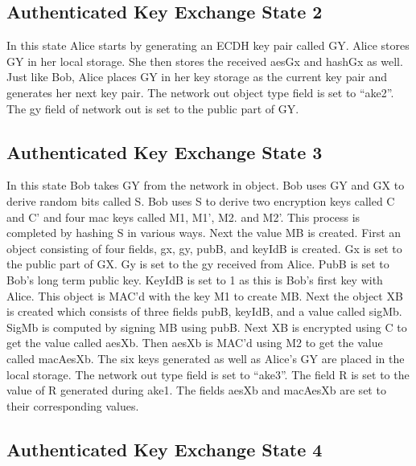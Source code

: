 \subsection{Authenticated Key Exchange State 2}


In this state Alice starts by generating an ECDH key pair called GY. Alice stores GY in her local storage. She then stores the received aesGx and hashGx as well. Just like Bob, Alice places GY in her key storage as the current key pair and generates her next key pair. The network out object type field is set to “ake2”. The gy field of network out is set to the public part of GY.


\subsection{Authenticated Key Exchange State 3}


In this state Bob takes GY from the network in object. Bob uses GY and GX to derive random bits called S. Bob uses S to derive two encryption keys called C and C’ and four mac keys called M1, M1’, M2. and M2’. This process is completed by hashing S in various ways. Next the value MB is created. First an object consisting of four fields, gx, gy, pubB, and keyIdB is created. Gx is set to the public part of GX. Gy is set to the gy received from Alice. PubB is set to Bob’s long term public key. KeyIdB is set to 1 as this is Bob’s first key with Alice. This object is MAC’d with the key M1 to create MB. Next the object XB is created which consists of three fields pubB, keyIdB, and a value called sigMb. SigMb is computed by signing MB using pubB. Next XB is encrypted using C to get the value called aesXb. Then aesXb is MAC’d using M2 to get the value called macAesXb. The six keys generated as well as Alice’s GY are placed in the local storage. The network out type field is set to “ake3”. The field R is set to the value of R generated during ake1. The fields aesXb and macAesXb are set to their corresponding values.


\subsection{Authenticated Key Exchange State 4}


